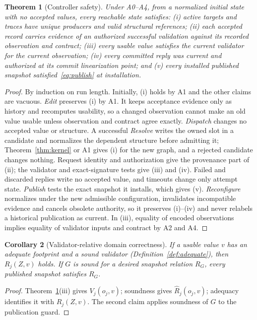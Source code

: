 \documentclass[10pt,journal,compsoc]{IEEEtran}
\theoremstyle{plain}
\newtheorem{theorem}{Theorem}
\newtheorem{corollary}[theorem]{Corollary}
\theoremstyle{definition}
\begin{document}
\begin{theorem}[Controller safety]\label{thm:safety}
Under A0--A4, from a normalized initial state with no accepted values, every reachable state satisfies:
(i) active targets and traces have unique producers and valid structural references;
(ii) each accepted record carries evidence of an authorized successful validation against its recorded observation and contract;
(iii) every usable value satisfies the current validator for the current observation;
(iv) every committed reply was current and authorized at its commit linearization point; and
(v) every installed published snapshot satisfied~\eqref{eq:publish} at installation.
\end{theorem}
\begin{proof}
By induction on run length. Initially, (i) holds by A1 and the other claims are vacuous. \emph{Edit} preserves (i) by A1. It keeps acceptance evidence only as history and recomputes usability, so a changed observation cannot make an old value usable unless observation and contract agree exactly. \emph{Dispatch} changes no accepted value or structure. A successful \emph{Resolve} writes the owned slot in a candidate and normalizes the dependent structure before admitting it; Theorem~\ref{thm:kernel} or A1 gives (i) for the new graph, and a rejected candidate changes nothing. Request identity and authorization give the provenance part of (ii); the validator and exact-signature tests give (iii) and (iv). Failed and discarded replies write no accepted value, and timeouts change only attempt state. \emph{Publish} tests the exact snapshot it installs, which gives (v). \emph{Reconfigure} normalizes under the new admissible configuration, invalidates incompatible evidence and cancels obsolete authority, so it preserves (i)--(iv) and never relabels a historical publication as current. In (iii), equality of encoded observations implies equality of validator inputs and contract by A2 and A4.
\end{proof}

\begin{corollary}[Validator-relative domain correctness]\label{cor:domain}
If a usable value $v$ has an adequate footprint and a sound validator (Definition~\ref{def:adequate}), then $R_j(Z,v)$ holds. If $G$ is sound for a desired snapshot relation $R_G$, every published snapshot satisfies $R_G$.
\end{corollary}
\begin{proof}
Theorem~\ref{thm:safety}(iii) gives $V_j(o_j,v)$; soundness gives $\widehat R_j(o_j,v)$; adequacy identifies it with $R_j(Z,v)$. The second claim applies soundness of $G$ to the publication guard.
\end{proof}
\end{document}

